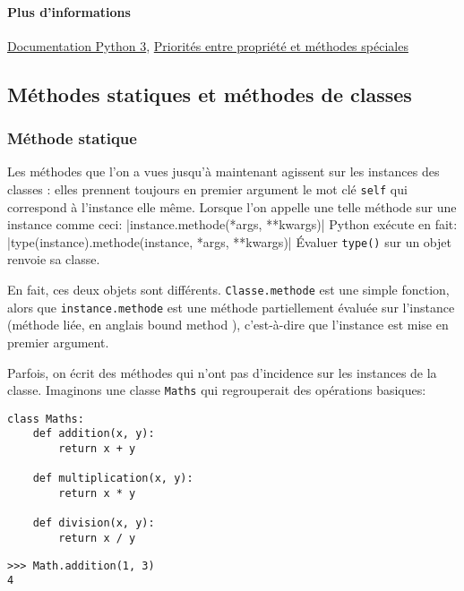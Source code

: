 \paragraph{Plus d'informations}\href{https://docs.python.org/fr/3/library/functions.html?highlight=property#property}{Documentation Python 3}, \href{https://stackoverflow.com/questions/15750522/class-properties-and-setattr/15751159#15751159}{Priorités entre propriété et méthodes spéciales}

\subsection{Méthodes statiques et méthodes de classes}
\subsubsection{Méthode statique}
\label{sec:staticmethod}

Les méthodes que l'on a vues jusqu'à maintenant agissent sur les instances des classes : elles prennent toujours en premier argument le mot clé \texttt{self} qui correspond à l'instance elle même. Lorsque l'on appelle une telle méthode sur une instance comme ceci:
|instance.methode(*args, **kwargs)|
Python exécute en fait: |type(instance).methode(instance, *args, **kwargs)|
Évaluer \texttt{type()} sur un objet renvoie sa classe.\medskip

En fait, ces deux objets sont différents. \texttt{Classe.methode} est une simple fonction, alors que \texttt{instance.methode} est une méthode partiellement évaluée sur l'instance (méthode liée, en anglais \og bound method \fg{}), c'est-à-dire que l'instance est mise en premier argument.\medskip

Parfois, on écrit des méthodes qui n'ont pas d'incidence sur les instances de la classe. Imaginons une classe \texttt{Maths} qui regrouperait des opérations basiques:

\begin{verbatim}
class Maths:
    def addition(x, y):
        return x + y

    def multiplication(x, y):
        return x * y

    def division(x, y):
        return x / y
\end{verbatim}

\begin{verbatim}
>>> Math.addition(1, 3)
4
\end{verbatim}

